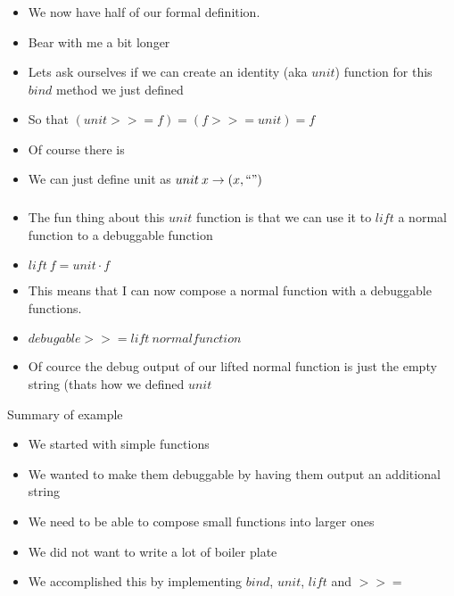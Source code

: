 \begin{frame}[fragile]
    \frametitle{}
    \begin{block}{}
        \begin{itemize}
            \item We now have half of our formal definition.
            \item Bear with me a bit longer
        \end{itemize}
    \end{block}
    \begin{block}{}
        \begin{itemize}
            \item Lets ask ourselves if we can create an identity (aka $unit$) function for this $bind$ method we just defined
            \item So that $(unit >>= f) = (f >>= unit) = f$
            \item Of course there is
            \item We can just define unit as $unit \: x \rightarrow (x, ``")$
        \end{itemize}
    \end{block}
\end{frame}

\begin{frame}[fragile]
    \frametitle{}
    \begin{block}{}
        \begin{itemize}
            \item The fun thing about this $unit$ function is that we can use it to $lift$ a normal function to a debuggable function
            \item $lift \: f = unit \cdot f$
            \item This means that I can now compose a normal function with a debuggable functions.
            \item $debugable >>= lift \: normalfunction$
            \item Of cource the debug output of our lifted normal function is just the empty string (thats how we defined $unit$
        \end{itemize}
    \end{block}
\end{frame}

\begin{frame}[fragile]{}
    \begin{block}{Summary of example}
        \begin{itemize}
            \item We started with simple functions
            \item We wanted to make them debuggable by having them output an additional string
            \item We need to be able to compose small functions into larger ones
            \item We did not want to write a lot of boiler plate
            \item We accomplished this by implementing $bind$, $unit$, $lift$ and $>>=$
        \end{itemize}
    \end{block}
\end{frame}
